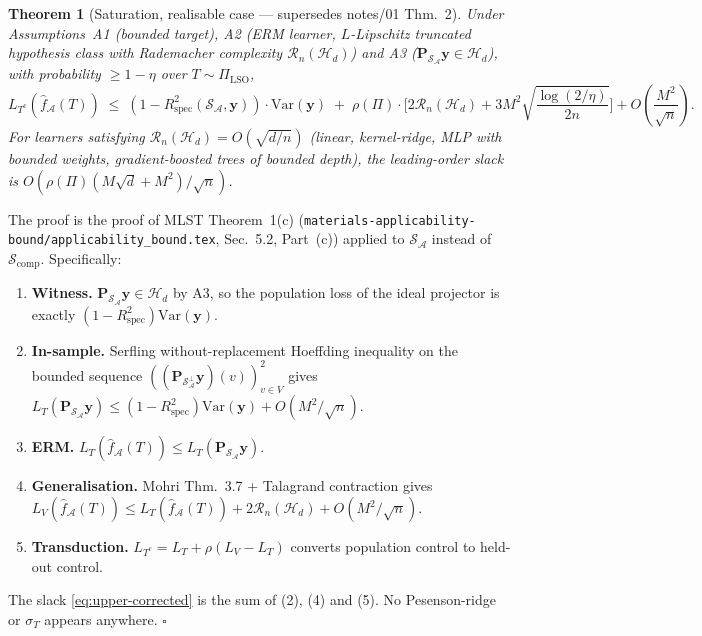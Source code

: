 \documentclass[11pt,a4paper]{article}
\theoremstyle{plain}
\newtheorem{theorem}{Theorem}
\theoremstyle{definition}
\theoremstyle{remark}
\newcommand{\by}{\mathbf{y}}
\newcommand{\bP}{\mathbf{P}}
\newcommand{\Var}{\mathrm{Var}}
\newcommand{\Rspec}{R^2_{\mathrm{spec}}}
\newcommand{\Scal}{\mathcal{S}}
\newcommand{\Acal}{\mathcal{A}}
\newcommand{\Hcal}{\mathcal{H}}
\begin{document}
\begin{theorem}[Saturation, realisable case — supersedes notes/01 Thm.~2]
\label{thm:upper-corrected}
Under Assumptions~A1 (bounded target), A2 (ERM learner, $L$-Lipschitz
truncated hypothesis class with Rademacher complexity
$\mathcal{R}_n(\Hcal_d)$) and A3 ($\bP_{\Scal_\Acal}\by \in \Hcal_d$),
with probability $\geq 1 - \eta$ over $T \sim \Pi_{\mathrm{LSO}}$,
\begin{equation}
    L_{T^c}(\hat f_\Acal(T))
    \;\leq\; (1 - \Rspec(\Scal_\Acal, \by)) \cdot \Var(\by)
        \;+\; \rho(\Pi) \cdot \Bigg[
            2 \mathcal{R}_n(\Hcal_d)
            + 3 M^2 \sqrt{\frac{\log(2/\eta)}{2 n}}
          \Bigg]
        + O\!\left(\frac{M^2}{\sqrt{n}}\right).
    \label{eq:upper-corrected}
\end{equation}
For learners satisfying $\mathcal{R}_n(\Hcal_d) = O(\sqrt{d/n})$
(linear, kernel-ridge, MLP with bounded weights, gradient-boosted trees
of bounded depth), the leading-order slack is
$O(\rho(\Pi) (M \sqrt{d} + M^2) / \sqrt{n})$.
\end{theorem}

The proof is the proof of MLST Theorem~1(c)
(\texttt{materials-applicability-bound/applicability\_bound.tex},
Sec.~5.2, Part~(c)) applied to $\Scal_\Acal$ instead of
$\Scal_{\mathrm{comp}}$.  Specifically:

\begin{enumerate}
\item \textbf{Witness.}  $\bP_{\Scal_\Acal}\by \in \Hcal_d$ by A3, so the
    population loss of the ideal projector is exactly
    $(1 - \Rspec)\Var(\by)$.
\item \textbf{In-sample.}  Serfling without-replacement Hoeffding inequality
    on the bounded sequence $((\bP_{\Scal_\Acal^\perp}\by)(v))^2_{v\in V}$
    gives $L_T(\bP_{\Scal_\Acal}\by) \leq (1-\Rspec)\Var(\by) + O(M^2/\sqrt{n})$.
\item \textbf{ERM.}  $L_T(\hat f_\Acal(T)) \leq L_T(\bP_{\Scal_\Acal}\by)$.
\item \textbf{Generalisation.}  Mohri Thm.~3.7 + Talagrand contraction
    gives $L_V(\hat f_\Acal(T)) \leq L_T(\hat f_\Acal(T)) + 2\mathcal{R}_n(\Hcal_d)
    + O(M^2/\sqrt{n})$.
\item \textbf{Transduction.}  $L_{T^c} = L_T + \rho(L_V - L_T)$ converts
    population control to held-out control.
\end{enumerate}
The slack \eqref{eq:upper-corrected} is the sum of (2), (4) and (5).
No Pesenson-ridge or $\sigma_T$ appears anywhere.  $\square$
\end{document}
